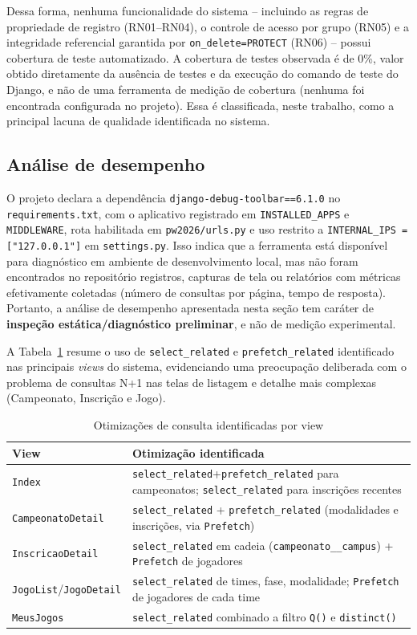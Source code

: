 \documentclass[12pt]{article}
\begin{document}
Dessa forma, nenhuma funcionalidade do sistema -- incluindo as regras de
propriedade de registro (RN01--RN04), o controle de acesso por grupo (RN05)
e a integridade referencial garantida por \texttt{on\_delete=PROTECT}
(RN06) -- possui cobertura de teste automatizado. A cobertura de testes
observada é de 0\%, valor obtido diretamente da ausência de testes e da
execução do comando de teste do Django, e não de uma ferramenta de medição
de cobertura (nenhuma foi encontrada configurada no projeto). Essa é
classificada, neste trabalho, como a principal lacuna de qualidade
identificada no sistema.

\subsection{Análise de desempenho}

O projeto declara a dependência \texttt{django-debug-toolbar==6.1.0} no
\texttt{requirements.txt}, com o aplicativo registrado em
\texttt{INSTALLED\_APPS} e \texttt{MIDDLEWARE}, rota habilitada em
\texttt{pw2026/urls.py} e uso restrito a \texttt{INTERNAL\_IPS =
["127.0.0.1"]} em \texttt{settings.py}. Isso indica que a ferramenta está
disponível para diagnóstico em ambiente de desenvolvimento local, mas não
foram encontrados no repositório registros, capturas de tela ou relatórios
com métricas efetivamente coletadas (número de consultas por página, tempo
de resposta). Portanto, a análise de desempenho apresentada nesta seção tem
caráter de \textbf{inspeção estática/diagnóstico preliminar}, e não de
medição experimental.

A Tabela~\ref{tab:desempenho} resume o uso de \texttt{select\_related} e
\texttt{prefetch\_related} identificado nas principais \emph{views} do
sistema, evidenciando uma preocupação deliberada com o problema de consultas
N+1 nas telas de listagem e detalhe mais complexas (Campeonato, Inscrição e
Jogo).

\begin{table}[ht]
\centering
\caption{Otimizações de consulta identificadas por view}
\label{tab:desempenho}
\small
\begin{tabular}{@{}p{2.7cm}p{5.3cm}@{}}
\toprule
\textbf{View} & \textbf{Otimização identificada} \\
\midrule
\texttt{Index} & \texttt{select\_related}+\texttt{prefetch\_related} para campeonatos; \texttt{select\_related} para inscrições recentes \\
\texttt{CampeonatoDetail} & \texttt{select\_related} + \texttt{prefetch\_related} (modalidades e inscrições, via \texttt{Prefetch}) \\
\texttt{InscricaoDetail} & \texttt{select\_related} em cadeia (\texttt{campeonato\_\_campus}) + \texttt{Prefetch} de jogadores \\
\texttt{JogoList}/\texttt{JogoDetail} & \texttt{select\_related} de times, fase, modalidade; \texttt{Prefetch} de jogadores de cada time \\
\texttt{MeusJogos} & \texttt{select\_related} combinado a filtro \texttt{Q()} e \texttt{distinct()} \\
\bottomrule
\end{tabular}
\end{table}
\end{document}
